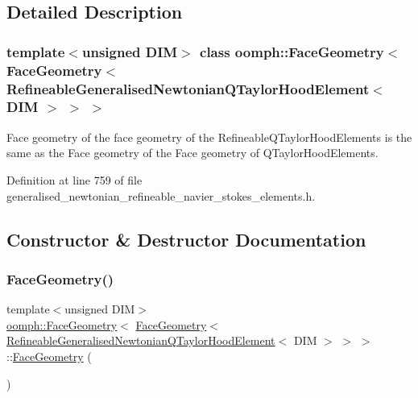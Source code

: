 \subsection{Detailed Description}
\subsubsection*{template$<$unsigned D\+IM$>$\newline
class oomph\+::\+Face\+Geometry$<$ Face\+Geometry$<$ Refineable\+Generalised\+Newtonian\+Q\+Taylor\+Hood\+Element$<$ D\+I\+M $>$ $>$ $>$}

Face geometry of the face geometry of the Refineable\+Q\+Taylor\+Hood\+Elements is the same as the Face geometry of the Face geometry of Q\+Taylor\+Hood\+Elements. 

Definition at line 759 of file generalised\+\_\+newtonian\+\_\+refineable\+\_\+navier\+\_\+stokes\+\_\+elements.\+h.



\subsection{Constructor \& Destructor Documentation}
\mbox{\label{classoomph_1_1FaceGeometry_3_01FaceGeometry_3_01RefineableGeneralisedNewtonianQTaylorHoodElement_3_01DIM_01_4_01_4_01_4_ad34eb4fcba90736af7510ad1e3233c60}} 
\subsubsection{\texorpdfstring{Face\+Geometry()}{FaceGeometry()}}
{\footnotesize\ttfamily template$<$unsigned D\+IM$>$ \\
\hyperlink{classoomph_1_1FaceGeometry}{oomph\+::\+Face\+Geometry}$<$ \hyperlink{classoomph_1_1FaceGeometry}{Face\+Geometry}$<$ \hyperlink{classoomph_1_1RefineableGeneralisedNewtonianQTaylorHoodElement}{Refineable\+Generalised\+Newtonian\+Q\+Taylor\+Hood\+Element}$<$ D\+IM $>$ $>$ $>$\+::\hyperlink{classoomph_1_1FaceGeometry}{Face\+Geometry} (\begin{DoxyParamCaption}{ }\end{DoxyParamCaption})\hspace{0.3cm}{\ttfamily [inline]}}



